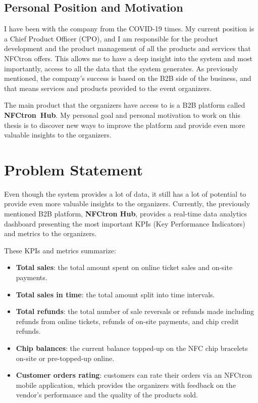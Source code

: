 \subsection*{Personal Position and Motivation}
\label{subsec:introduction-background-motivation}
I have been with the company from the COVID-19 times.
My current position is a Chief Product Officer (CPO), and I am responsible for the product development and the product management of all the products and services that NFCtron offers.
This allows me to have a deep insight into the system and most importantly, access to all the data that the system generates.
As previously mentioned, the company's success is based on the B2B side of the business, and that means services and products provided to the event organizers.

The main product that the organizers have access to is a B2B platform called \textbf{NFCtron~Hub}.
My personal goal and personal motivation to work on this thesis is to discover new ways to improve the platform and provide even more valuable insights to the organizers.

\section*{Problem Statement}
\label{sec:introduction-problem-statement}
Even though the system provides a lot of data, it still has a lot of potential to provide even more valuable insights to the organizers.
Currently, the previously mentioned B2B platform, \textbf{NFCtron Hub}, provides a real-time data analytics dashboard presenting the most important KPIs (Key Performance Indicators) and metrics to the organizers.

These KPIs and metrics summarize:
\begin{itemize}
	\item \textbf{Total sales}: the total amount spent on online ticket sales and on-site payments.
	\item \textbf{Total sales in time}: the total amount split into time intervals.
	\item \textbf{Total refunds}: the total number of sale reversals or refunds made including refunds from online tickets, refunds of on-site payments, and chip credit refunds.
	\item \textbf{Chip balances}: the current balance topped-up on the NFC chip bracelets on-site or pre-topped-up online.
	\item \textbf{Customer orders rating}: customers can rate their orders via an NFCtron mobile application, which provides the organizers with feedback on the vendor's performance and the quality of the products sold.
\end{itemize}

